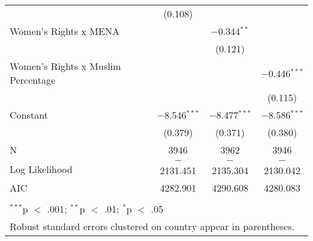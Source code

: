 \begin{table}[!htbp]
\begin{tabular}{@{\extracolsep{5pt}}lccc}
  & (0.108) &  &  \\ 
  Women's Rights x MENA &  & $-$0.344$^{**}$ &  \\ 
  &  & (0.121) &  \\ 
  Women's Rights x Muslim Percentage &  &  & $-$0.446$^{***}$ \\ 
  &  &  & (0.115) \\ 
  Constant & $-$8.546$^{***}$ & $-$8.477$^{***}$ & $-$8.586$^{***}$ \\ 
  & (0.379) & (0.371) & (0.380) \\ 
 N & 3946 & 3962 & 3946 \\ 
Log Likelihood & $-$2131.451 & $-$2135.304 & $-$2130.042 \\ 
AIC & 4282.901 & 4290.608 & 4280.083 \\ 
\hline \\[-1.8ex] 
\multicolumn{4}{l}{$^{***}$p $<$ .001; $^{**}$p $<$ .01; $^{*}$p $<$ .05} \\ 
\multicolumn{4}{l}{Robust standard errors clustered on country appear in parentheses.} \\ 
\end{tabular} 
\end{table} 
